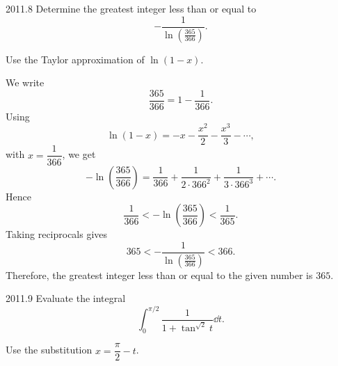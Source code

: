     \begin{pastproblem}{2011.8}
        Determine the greatest integer less than or equal to
        \[
            -\frac{1}{\ln\left(\frac{365}{366}\right)}.
        \]

        \begin{hint}
            Use the Taylor approximation of $\ln(1-x)$.
        \end{hint}
    \end{pastproblem}

    \begin{solution}
        We write
        \[
            \frac{365}{366}=1-\frac{1}{366}.
        \]
        Using
        \[
            \ln(1-x)
            =
            -x-\frac{x^2}{2}-\frac{x^3}{3}-\cdots,
        \]
        with $x=\dfrac{1}{366}$, we get
        \[
            -\ln\left(\frac{365}{366}\right)
            =
            \frac{1}{366}
            +
            \frac{1}{2\cdot 366^2}
            +
            \frac{1}{3\cdot 366^3}
            +
            \cdots.
        \]
        Hence
        \[
            \frac{1}{366}
            <
            -\ln\left(\frac{365}{366}\right)
            <
            \frac{1}{365}.
        \]
        Taking reciprocals gives
        \[
            365
            <
            -\frac{1}{\ln\left(\frac{365}{366}\right)}
            <
            366.
        \]
        Therefore, the greatest integer less than or equal to the given number is $\boxed{365}$.
    \end{solution}

    \begin{pastproblem}{2011.9}
        Evaluate the integral
        \[
            \int_0^{\pi/2}
            \frac{1}{1+\tan^{\sqrt{2}}t}\dd t.
        \]

        \begin{hint}
            Use the substitution $x=\dfrac{\pi}{2}-t$.
        \end{hint}
    \end{pastproblem}

